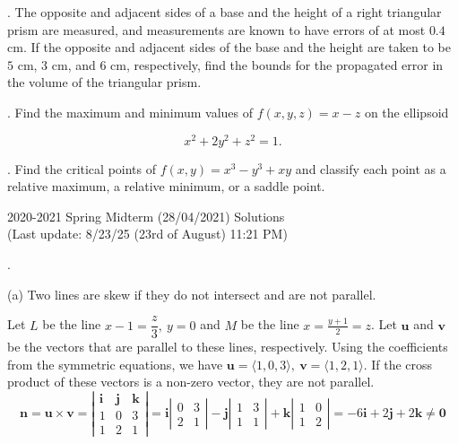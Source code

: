 \documentclass{article}
\begin{document}
\hfill

. The opposite and adjacent sides of a base and the height of a right triangular prism are measured, and measurements are known to have errors of at most $0.4$ cm. If the opposite and adjacent sides of the base and the height are taken to be $5$ cm, $3$ cm, and $6$ cm, respectively, find the bounds for the propagated error in the volume of the triangular prism.

\hfill

. Find the maximum and minimum values of $f(x,y,z)=x-z$ on the ellipsoid

\[x^2+2y^2+z^2=1.\]

\hfill

. Find the critical points of $f(x,y)=x^3-y^3+xy$ and classify each point as a relative maximum, a relative minimum, or a saddle point.

\newpage

\begin{center}
2020-2021 Spring Midterm (28/04/2021) Solutions\\
(Last update: 8/23/25 (23rd of August) 11:21 PM)
\end{center}

.

\hfill

\noindent (a) Two lines are skew if they do not intersect and are not parallel.

\hfill

\noindent Let $L$ be the line $x-1=\dfrac z3,\: y=0$  and $M$ be the line $\displaystyle x=\frac{y+1}2=z$. Let $\mathbf u$ and $\mathbf v$ be the vectors that are parallel to these lines, respectively. Using the coefficients from the symmetric equations, we have $\mathbf u=\langle1,0,3\rangle, \:\mathbf v= \langle1,2,1\rangle$. If the cross product of these vectors is a non-zero vector, they are not parallel.
\[\mathbf{n}=\mathbf{u}\times\mathbf{v}=\left|\begin{array}{ccc}
\mathbf{i}&\mathbf{j}&\mathbf{k}\\
1&0&3\\
1&2&1
\end{array}\right|=\mathbf{i}\left|\begin{array}{cc}
0&3\\2&1
\end{array}\right|-\mathbf{j}\left|\begin{array}{cc}
1&3\\1&1
\end{array}\right|+\mathbf{k}\left|\begin{array}{cc}
1&0\\1&2
\end{array}\right|=-6\mathbf{i}+2\mathbf{j}+2\mathbf{k}\neq\mathbf{0}\]
\end{document}
